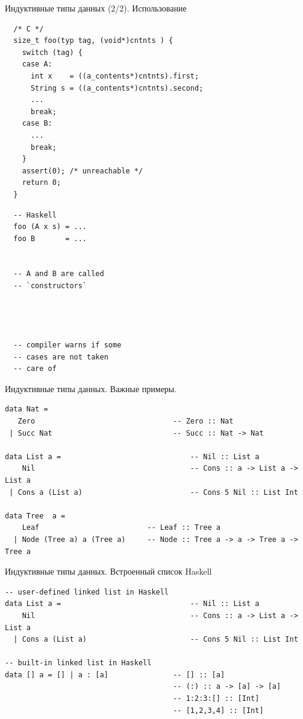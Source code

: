 \documentclass[aspectratio=169
  , xcolor={svgnames}
  , hyperref=
      { colorlinks
      , urlcolor=DarkBlue 
      }  
  , russian  %
  ]{beamer}
\theoremstyle{exerciseStyle1}
\begin{document}
\begin{frame}[fragile]{Индуктивные типы данных (2/2). Использование}


\begin{minipage}{.65\textwidth}
  \begin{verbatim}
  /* C */
  size_t foo(typ tag, (void*)cntnts ) {
    switch (tag) {
    case A: 
      int x    = ((a_contents*)cntnts).first;
      String s = ((a_contents*)cntnts).second;
      ...
      break;
    case B:
      ...
      break;
    }    
    assert(0); /* unreachable */
    return 0;
  }
  \end{verbatim}
\end{minipage}
\begin{minipage}{.3\textwidth}
  \begin{verbatim}
  -- Haskell
  foo (A x s) = ...
  foo B       = ...


  -- A and B are called 
  -- `constructors`
  
  
  
  
  -- compiler warns if some
  -- cases are not taken
  -- care of
  \end{verbatim}
\end{minipage}
\end{frame}

\begin{frame}[fragile]{Индуктивные типы данных. Важные примеры.}
\begin{verbatim}
data Nat = 
   Zero                                -- Zero :: Nat
 | Succ Nat                            -- Succ :: Nat -> Nat

data List a =                              -- Nil :: List a
    Nil                                    -- Cons :: a -> List a -> List a
 | Cons a (List a)                         -- Cons 5 Nil :: List Int

data Tree  a = 
    Leaf                         -- Leaf :: Tree a
  | Node (Tree a) a (Tree a)     -- Node :: Tree a -> a -> Tree a -> Tree a
\end{verbatim}
\end{frame}

\begin{frame}[fragile]{Индуктивные типы данных. Встроенный список Haskell}
\begin{verbatim}
-- user-defined linked list in Haskell
data List a =                              -- Nil :: List a
    Nil                                    -- Cons :: a -> List a -> List a
  | Cons a (List a)                        -- Cons 5 Nil :: List Int

-- built-in linked list in Haskell
data [] a = [] | a : [a]               -- [] :: [a]
                                       -- (:) :: a -> [a] -> [a]
                                       -- 1:2:3:[] :: [Int]
                                       -- [1,2,3,4] :: [Int]
\end{verbatim}
\end{frame}
\end{document}
